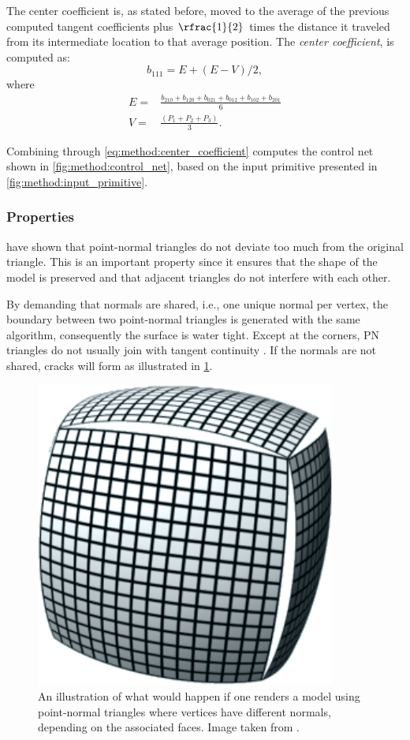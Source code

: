 	The center coefficient is, as stated before, moved to the average of the previous computed tangent coefficients plus $\rfrac{1}{2}$ times the distance it traveled from its intermediate location to that average position. The \textit{center coefficient}, is computed as:
	\begin{equation}\label{eq:method:center_coefficient}
		b_{111} = E + (E - V) / 2,
	\end{equation}
	where
	\begin{align*}
		E = {}& \frac{b_{210} + b_{120} + b_{021} + b_{012} + b_{102} + b_{201}}{6}\\
		V = {}& \frac{(P_1 + P_2 + P_3)}{3}.
	\end{align*}

	Combining  through \ref{eq:method:center_coefficient} computes the control net shown in \cref{fig:method:control_net}, based on the input primitive presented in \cref{fig:method:input_primitive}.

\subsubsection{Properties}
\label{sss:method:geometry:properties}
	\citeauthor{vlachos2001curved} have shown that point-normal triangles do not deviate too much from the original triangle. This is an important property since it ensures that the shape of the model is preserved and that adjacent triangles do not interfere with each other. 

	By demanding that normals are shared, i.e., one unique normal per vertex, the boundary between two point-normal triangles is generated with the same algorithm, consequently the surface is water tight. Except at the corners, PN triangles do not usually join with tangent continuity \cite{vlachos2001curved}. If the normals are not shared, cracks will form as illustrated in \cref{fig:method:cracks}.

	\begin{figure}
		\centering
		\includegraphics[width=0.4\columnwidth]{./content/img/method/cracks.png}
		\caption{An illustration of what would happen if one renders a model using point-normal triangles where vertices have different normals, depending on the associated faces. Image taken from \cite{mcdonald2010crack}.}
		\label{fig:method:cracks}
	\end{figure}
